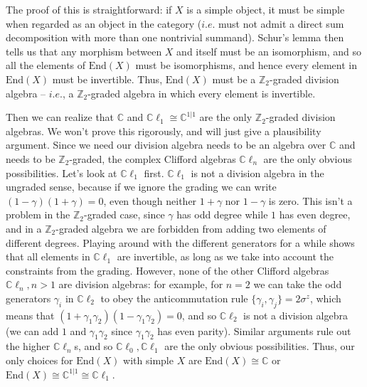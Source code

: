 \documentclass[12pt,a4paper]{article}
\newcommand{\cc}{\mathbb{C}}
\newcommand{\zt}{\mathbb{Z}_2}
\newcommand{\End}{\text{End}}
\newcommand{\cl}{\mathbb{C}\ell}
\begin{document}
The proof of this is straightforward: if $X$ is a simple object, it must be simple when regarded as an object in the category ($i.e.$ must not admit a direct sum decomposition with more than one nontrivial summand). Schur's lemma then tells us that any morphism between $X$ and itself must be an isomorphism, and so all the elements of $\End(X)$ must be isomorphisms, and hence every element in $\End(X)$ must be invertible. Thus, $\End(X)$ must be a $\zt$-graded division algebra -- $i.e.$, a $\zt$-graded algebra in which every element is invertible. 

Then we can realize that 
$\cc$ and $\cl_1\cong\cc^{1|1}$ are the only $\zt$-graded division algebras.
We won't prove this rigorously, and will just give a plausibility argument. Since we need our division algebra needs to be an algebra over $\cc$ and needs to be $\zt$-graded, the complex Clifford algebras $\cl_n$ are the only obvious possibilities. Let's look at $\cl_1$ first.
$\cl_1$ is not a division algebra in the ungraded sense, because if we ignore the grading we can write $(1-\gamma)(1+\gamma) = 0$, even though neither $1+\gamma$ nor $1-\gamma$ is zero. This isn't a problem in the $\zt$-graded case, since $\gamma$ has odd degree while $1$ has even degree, and in a $\zt$-graded algebra we are forbidden from adding two elements of different degrees. Playing around with the different generators for a while shows that all elements in $\cl_1$ are invertible, as long as we take into account the constraints from the grading. However, none of the other Clifford algebras $\cl_n, n>1$ are division algebras: for example, for $n=2$ we can take the odd generators $\gamma_i$ in $\cl_2$ to obey the anticommutation rule $\{ \gamma_i ,\gamma_j\} = 2\sigma^z$, which means that $(1+\gamma_1\gamma_2)(1-\gamma_1\gamma_2) = 0$, and so $\cl_2$ is not a division algebra (we can add $1$ and $\gamma_1\gamma_2$ since $\gamma_1\gamma_2$ has even parity). Similar arguments rule out the higher $\cl_n$s, and so $\cl_0,\cl_1$ are the only obvious possibilities. Thus, our only choices for $\End(X)$ with simple $X$ are $\End(X) \cong \cc$ or $\End(X) \cong \cc^{1|1} \cong \cl_1.$
\end{document}
